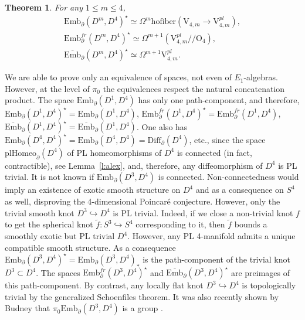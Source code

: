 \documentclass[11pt]{amsart}
\newtheorem{theorem}{Theorem}[section]
\theoremstyle{definition}
\newcommand{\Ebar}{\overline{\mathrm{Emb}}}
\newcommand{\Emb}{\mathrm{Emb}}
\newcommand{\Diff}{\mathrm{Diff}}
\newcommand{\plHomeo}{\mathrm{plHomeo}}
\newcommand{\OO}{\mathrm{O}}
\newcommand{\VV}{\mathrm{V}}
\newcommand{\hofiber}{\mathrm{hofiber}}
\newcommand\rth{\refstepcounter{equation}}
\newcommand\numb{\rth{\rm \theequation}}
\numberwithin{equation}{section}
\begin{document}
\begin{theorem}\label{th:d4}
For any $1\leq m\leq 4$,
\begin{gather}
\Emb_\partial(D^m,D^4)^\star\simeq \Omega^m\hofiber (\VV_{4,m}\to \VV^{pl}_{4,m}),
\label{eq_th_d4_1}\\
\Emb_\partial^{fr}(D^m,D^4)^\star\simeq\Omega^{m+1}(\VV^{pl}_{4,m}/\!\!/\OO_4),
\label{eq_th_d4_2}\\
\Ebar_\partial(D^m,D^4)^\star\simeq\Omega^{m+1}\VV^{pl}_{4,m}.
\label{eq_th_d4_3}
\end{gather}
\end{theorem}
We are able to prove only an equivalence of spaces, not even of $E_1$-algebras. However, at the level of $\pi_0$ the equivalences respect the natural concatenation  product. %
 The space $\Emb_\partial(D^1,D^4)$ has only one
path-component, and therefore, $\Emb_\partial(D^1,D^4)^\star=\Emb_\partial(D^1,D^4)$, 
$\Emb_\partial^{fr}(D^1,D^4)^\star=\Emb_\partial^{fr}(D^1,D^4)$, $\Ebar_\partial(D^1,D^4)^\star=\Ebar_\partial(D^1,D^4)$. One also has $\Emb_\partial(D^4,D^4)^\star=\Emb_\partial(D^4,D^4)
=\Diff_\partial(D^4)$, etc., since the space $\plHomeo_\partial(D^4)$ of PL homeomorphisms of $D^4$ is connected (in fact, contractible), see Lemma~\ref{l:alex}, and, therefore, any diffeomorphism of $D^4$ is PL trivial.
It is not known if $\Emb_\partial(D^3,D^4)$ is connected.
Non-connectedness would imply an existence of exotic smooth structure on $D^4$ and as a consequence on $S^4$ as well,
disproving the 4-dimensional Poincar\'e conjecture.  %
 However, only the trivial smooth knot $D^3\hookrightarrow D^4$ is PL trivial. Indeed,
if we close a non-trivial knot $f$ to get the  spherical knot $\tilde f\colon S^3\hookrightarrow S^4$ corresponding to
 it, then $\tilde f$ bounds a smoothly exotic
but PL trivial $D^4$. However, any PL 4-manifold admits a unique compatible smooth structure. As a consequence  
$\Emb_\partial(D^3,D^4)^\star=\Emb_\partial(D^3,D^4)_*$ is the path-component of the trivial knot $D^3\subset D^4$. 
The spaces $\Emb_\partial^{fr}(D^3,D^4)^\star$
and  $\Ebar_\partial(D^3,D^4)^\star$ are preimages of this path-component. By contrast, any locally flat knot $D^3\hookrightarrow D^4$ is topologically trivial
by the generalized Schoenfiles theorem. It was also recently shown by Budney that $\pi_0 \Emb_\partial(D^3,D^4)$ is a group
\cite[Theorem~4.1]{Budney_stab}.
\end{document}
